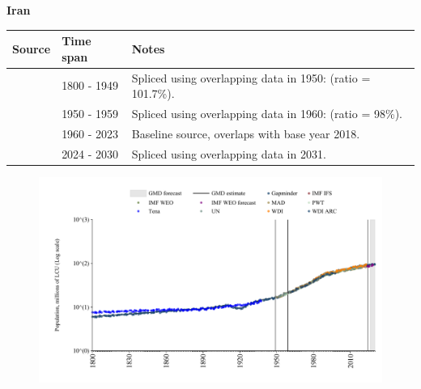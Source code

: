 \documentclass[12pt,a4paper,landscape]{article}
\begin{document}
\begin{adjustbox}{max totalsize={\paperwidth}{\paperheight},center}
\begin{minipage}[t][\textheight][t]{\textwidth}
\vspace*{0.5cm}
{}
\begin{center}
{\Large\bfseries Iran}
\end{center}
\vspace{0.5cm}
\begin{table}[H]
\centering
\small
\begin{tabular}{|l|l|l|}
\hline
\textbf{Source} & \textbf{Time span} & \textbf{Notes} \\
\hline
\rowcolor{white}\cite{Gapminder}& 1800 - 1949 &Spliced using overlapping data in 1950: (ratio = 101.7\%).\\
\rowcolor{lightgray}\cite{IMF_IFS}& 1950 - 1959 &Spliced using overlapping data in 1960: (ratio = 98\%).\\
\rowcolor{white}\cite{WDI}& 1960 - 2023 &Baseline source, overlaps with base year 2018.\\
\rowcolor{lightgray}\cite{Gapminder}& 2024 - 2030 &Spliced using overlapping data in 2031.\\
\hline
\end{tabular}
\end{table}
\begin{figure}[H]
\centering
\includegraphics[width=\textwidth,height=0.6\textheight,keepaspectratio]{graphs/IRN_pop.pdf}
\end{figure}
\end{minipage}
\end{adjustbox}
\end{document}
